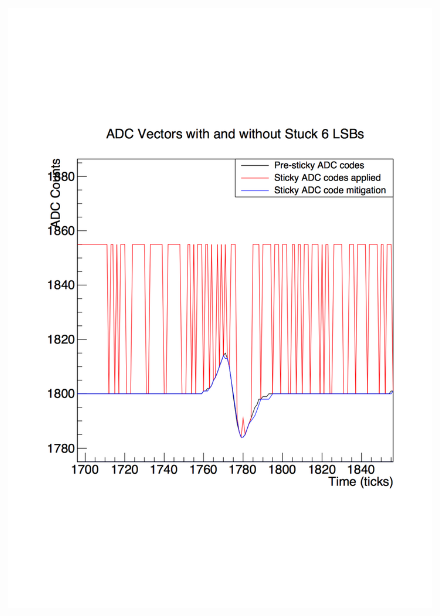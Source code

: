 \begin{figure}[h!]
  \centering
  \begin{minipage}{0.45\textwidth}
    \centering
    \includegraphics[width=\textwidth]{StuckCodes}
  \end{minipage}
  \hspace{0.08\textwidth}
  \begin{minipage}{0.45\textwidth}
    \centering

\end{minipage}
\end{figure}
